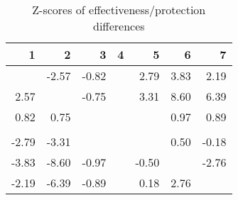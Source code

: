 \begin{table}[ht]
\centering
\begin{tabular}{rrrrrrr}
  \hline
1 & 2 & 3 & 4 & 5 & 6 & 7 \\ 
  \hline
 & -2.57 & -0.82 &  & 2.79 & 3.83 & 2.19 \\ 
  2.57 &  & -0.75 &  & 3.31 & 8.60 & 6.39 \\ 
  0.82 & 0.75 &  &  &  & 0.97 & 0.89 \\ 
   &  &  &  &  &  &  \\ 
  -2.79 & -3.31 &  &  &  & 0.50 & -0.18 \\ 
  -3.83 & -8.60 & -0.97 &  & -0.50 &  & -2.76 \\ 
  -2.19 & -6.39 & -0.89 &  & 0.18 & 2.76 &  \\ 
   \hline
\end{tabular}
\caption{Z-scores of effectiveness/protection differences} 
\end{table}
